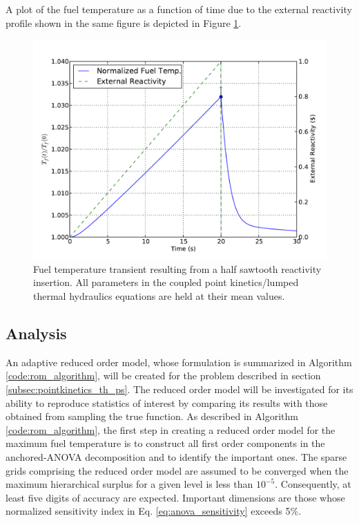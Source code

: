 A plot of the fuel temperature as a function of time due to the external reactivity profile shown in the same figure is depicted in Figure \ref{fig:pk_fuel_temp}. 
\begin{figure}[!htb]
\caption{ \label{fig:pk_fuel_temp}
Fuel temperature transient resulting from a half sawtooth reactivity insertion. All parameters in the coupled point kinetics/lumped thermal hydraulics equations are held at their mean values. 
}
 \begin{center}
  \includegraphics[scale=.75]{./Chapter3/pk_fueltemp.pdf}
 \end{center}
\end{figure}

\subsection{Analysis}
\label{subsec:pointkinetics_th_analysis}

An adaptive reduced order model, whose formulation is summarized in Algorithm \ref{code:rom_algorithm}, will be created for the problem described in section \ref{subsec:pointkinetics_th_ps}. The reduced order model will be investigated for its ability to reproduce statistics of interest by comparing its results with those obtained from sampling the true function. As described in Algorithm \ref{code:rom_algorithm}, the first step in creating a reduced order model for the maximum fuel temperature is to construct all first order components in the anchored-\ac{ANOVA} decomposition and to identify the important ones. The sparse grids comprising the reduced order model are assumed to be converged when the maximum hierarchical surplus for a given level is less than $10^{-5}$. Consequently, at least five digits of accuracy are expected. Important dimensions are those whose normalized sensitivity index in Eq. \ref{eq:anova_sensitivity} exceeds 5\%.

